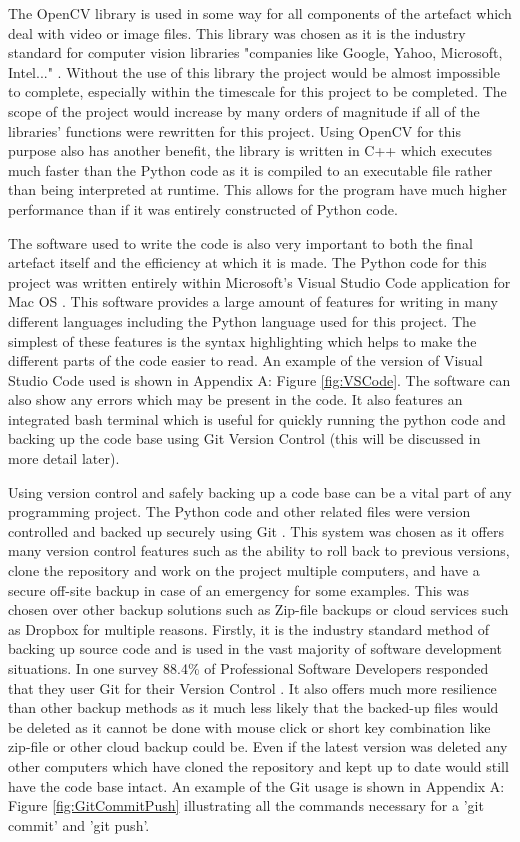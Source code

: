 \documentclass[11pt,a4paper]{report}
\begin{document}
The OpenCV library is used in some way for all components of the artefact which deal with video or image files. This library was chosen as it is the industry standard for computer vision libraries "companies like Google, Yahoo, Microsoft, Intel..." \citep{OpenCV}. Without the use of this library the project would be almost impossible to complete, especially within the timescale for this project to be completed. The scope of the project would increase by many orders of magnitude if all of the libraries' functions were rewritten for this project. Using OpenCV for this purpose also has another benefit, the library is written in C++ \citep{OpenCV} which executes much faster than the Python code as it is compiled to an executable file rather than being interpreted at runtime. This allows for the program have much higher performance than if it was entirely constructed of Python code.

The software used to write the code is also very important to both the final artefact itself and the efficiency at which it is made. The Python code for this project was written entirely within Microsoft's Visual Studio Code application for Mac OS \citep{VisualStudioCode}. This software provides a large amount of features for writing in many different languages including the Python language used for this project. The simplest of these features is the syntax highlighting which helps to make the different parts of the code easier to read. An example of the version of Visual Studio Code used is shown in Appendix A: Figure \ref{fig:VSCode}. The software can also show any errors which may be present in the code. It also features an integrated bash terminal which is useful for quickly running the python code and backing up the code base using Git Version Control (this will be discussed in more detail later).

Using version control and safely backing up a code base can be a vital part of any programming project. The Python code and other related files were version controlled and backed up securely using Git \citep{Git}. This system was chosen as it offers many version control features such as the ability to roll back to previous versions, clone the repository and work on the project multiple computers, and have a secure off-site backup in case of an emergency for some examples. This was chosen over other backup solutions such as Zip-file backups or cloud services such as Dropbox for multiple reasons. Firstly, it is the industry standard method of backing up source code and is used in the vast majority of software development situations. In one survey 88.4\% of Professional Software Developers responded that they user Git for their Version Control \citep{DeveloperSurvey}. It also offers much more resilience than other backup methods as it much less likely that the backed-up files would be deleted as it cannot be done with mouse click or short key combination like zip-file or other cloud backup could be. Even if the latest version was deleted any other computers which have cloned the repository and kept up to date would still have the code base intact. An example of the Git usage is shown in Appendix A: Figure \ref{fig:GitCommitPush} illustrating all the commands necessary for a 'git commit' and 'git push'.
\end{document}
